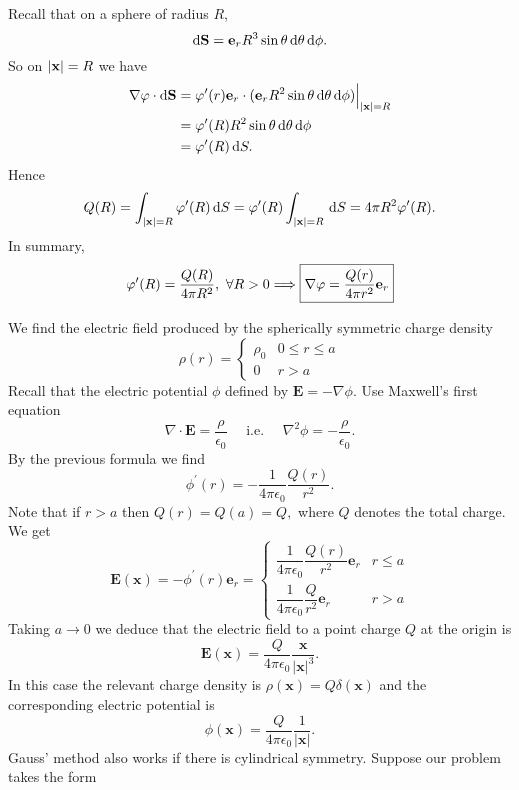 Recall that on a sphere of radius $R$, 
\[
    \mathrm{d}{\bf S} = {\bf e}_r R^3 \sin \theta \,\mathrm{d} \theta\,\mathrm{d} \phi.
\]
So on $ |{\bf x}|=R $ we have
\begin{align*}
    \nabla \varphi \cdot \mathrm{d}{\bf S}&= \varphi'(r){\bf e}_r \cdot ({\bf e}_r R^2 \sin \theta \,\mathrm{d} \theta\,\mathrm{d} \phi )\Big|_{|{\bf x}|=R}\\ 
    &= \varphi'(R)R^2 \sin \theta \,\mathrm{d} \theta\,\mathrm{d} \phi\\ 
    &= \varphi'(R)\,\mathrm{d} S.
\end{align*}
Hence 
\[
    Q(R) = \int_{|{\bf x}|=R} \varphi'(R) \,\mathrm{d}S = \varphi'(R)\int_{|{\bf x}|=R}  \,\mathrm{d}S = 4\pi R^2 \varphi'(R).
\]
In summary,
\[
    \varphi'(R) = \frac{Q(R)}{4\pi R^2},\ \forall R>0 \Longrightarrow  \boxed{\nabla\varphi = \frac{Q(r)}{4\pi r^2}{\bf e}_r}
\]

\begin{example}
    We find the electric field produced by the spherically symmetric charge density
    \[
    \rho(r)=\begin{cases}
        \rho_{0} & 0 \le r \le a \\
        0 & r>a
    \end{cases} 
    \]
    Recall that the electric potential $\phi$ defined by $\mathbf{E}=-\nabla \phi .$ Use Maxwell's first equation
    \[
    \nabla \cdot \mathbf{E}=\frac{\rho}{\epsilon_{0}} \quad \text { i.e. } \quad \nabla^{2} \phi=-\frac{\rho}{\epsilon_{0}}.
    \]
    By the previous formula we find
    \[
    \phi^{\prime}(r)=-\frac{1}{4 \pi \epsilon_{0}} \frac{Q(r)}{r^{2}}.
    \]
    Note that if $r>a$ then $Q(r)=Q(a)=Q,$ where $Q$ denotes the total charge. We get
    \[
    \mathbf{E}(\mathbf{x})=-\phi^{\prime}(r) \mathbf{e}_{r}=\begin{cases}
        \dfrac{1}{4 \pi \epsilon_{0}} \dfrac{Q(r)}{r^{2}} \mathbf{e}_{r} & r \le a \\[10pt]
        \dfrac{1}{4 \pi \epsilon_{0}} \dfrac{Q}{r^{2}} \mathbf{e}_{r} & r>a
    \end{cases} 
    \]
    Taking $a \rightarrow 0$ we deduce that the electric field to a point charge $Q$ at the origin is
    \[
    \mathbf{E}(\mathbf{x})=\frac{Q}{4 \pi \epsilon_{0}} \frac{\mathbf{x}}{|\mathbf{x}|^{3}}.
    \]
    In this case the relevant charge density is $\rho(\mathbf{x})=Q \delta(\mathbf{x})$ and the corresponding electric
    potential is
    \[
    \phi(\mathbf{x})=\frac{Q}{4 \pi \epsilon_{0}} \frac{1}{|\mathbf{x}|}.
    \]
    Gauss' method also works if there is cylindrical symmetry. Suppose our problem takes
    the form
    \[
\]
\end{example}
